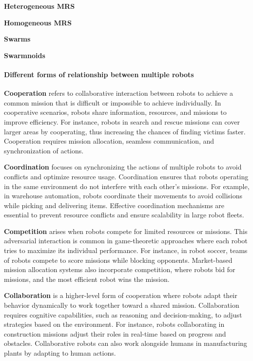 \documentclass{book}
\begin{document}
\textbf{Heterogeneous MRS}

\textbf{Homogeneous MRS}

\textbf{Swarms} 

\textbf{Swarmnoids}



\paragraph{Different forms of relationship between multiple robots}

\textbf{Cooperation} refers to collaborative interaction between robots to achieve a common mission that is difficult or impossible to achieve individually. In cooperative scenarios, robots share information, resources, and missions to improve efficiency. For instance, robots in search and rescue missions can cover larger areas by cooperating, thus increasing the chances of finding victims faster. Cooperation requires mission allocation, seamless communication, and synchronization of actions.

\textbf{Coordination} focuses on synchronizing the actions of multiple robots to avoid conflicts and optimize resource usage. Coordination ensures that robots operating in the same environment do not interfere with each other’s missions. For example, in warehouse automation, robots coordinate their movements to avoid collisions while picking and delivering items. Effective coordination mechanisms are essential to prevent resource conflicts and ensure scalability in large robot fleets.

\textbf{Competition} arises when robots compete for limited resources or missions. This adversarial interaction is common in game-theoretic approaches where each robot tries to maximize its individual performance. For instance, in robot soccer, teams of robots compete to score missions while blocking opponents. Market-based mission allocation systems also incorporate competition, where robots bid for missions, and the most efficient robot wins the mission.

\textbf{Collaboration} is a higher-level form of cooperation where robots adapt their behavior dynamically to work together toward a shared mission. Collaboration requires cognitive capabilities, such as reasoning and decision-making, to adjust strategies based on the environment. For instance, robots collaborating in construction missions adjust their roles in real-time based on progress and obstacles. Collaborative robots can also work alongside humans in manufacturing plants by adapting to human actions.
\end{document}
